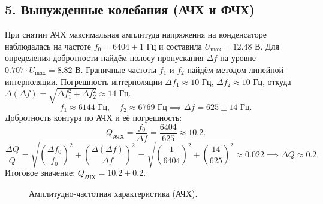 \documentclass[a4paper,12pt]{extarticle}
\begin{document}
\subsection*{5. Вынужденные колебания (АЧХ и ФЧХ)}
При снятии АЧХ максимальная амплитуда напряжения на конденсаторе наблюдалась на частоте $f_0 = 6404 \pm 1$ Гц и составила $U_{\max} = 12.48$ В.
Для определения добротности найдём полосу пропускания $\Delta f$ на уровне $0.707 \cdot U_{\max} = 8.82$ В.
Граничные частоты $f_1$ и $f_2$ найдём методом линейной интерполяции. Погрешность интерполяции $\Delta f_1 \approx 10$ Гц, $\Delta f_2 \approx 10$ Гц, откуда $\Delta(\Delta f) = \sqrt{\Delta f_1^2 + \Delta f_2^2} \approx 14$ Гц.
\begin{equation*}
    f_1 \approx 6144 \text{ Гц}, \quad f_2 \approx 6769 \text{ Гц} \implies \Delta f = 625 \pm 14 \text{ Гц}.
\end{equation*}
Добротность контура по АЧХ и её погрешность:
\begin{equation*}
    Q_{\text{АЧХ}} = \frac{f_0}{\Delta f} = \frac{6404}{625} \approx 10.2.
\end{equation*}
\begin{equation*}
    \frac{\Delta Q}{Q} = \sqrt{\left(\frac{\Delta f_0}{f_0}\right)^2 + \left(\frac{\Delta(\Delta f)}{\Delta f}\right)^2} = \sqrt{\left(\frac{1}{6404}\right)^2 + \left(\frac{14}{625}\right)^2} \approx 0.022 \implies \Delta Q \approx 0.2.
\end{equation*}
Итоговое значение: $Q_{\text{АЧХ}} = 10.2 \pm 0.2$.

\begin{figure}[H]
    \centering
    \caption{Амплитудно-частотная характеристика (АЧХ).}
    \label{fig:achx}
\end{figure}
\end{document}
